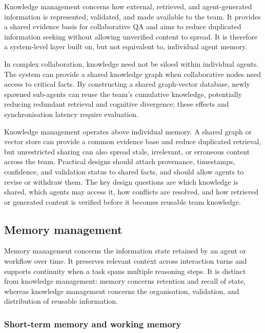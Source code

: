 \documentclass[a4paper,fleqn]{cas-dc}
\begin{document}
Knowledge management concerns how external, retrieved, and agent-generated
information is represented, validated, and made available to the team. It
provides a shared evidence basis for collaborative QA and aims to reduce
duplicated information seeking without allowing unverified content to spread.
It is therefore a system-level layer built on, but not equivalent to,
individual agent memory.

In complex collaboration, knowledge need not be siloed within individual
agents. The system can provide a shared knowledge graph when collaborative
nodes need access to critical facts. By constructing a shared graph-vector
database, newly spawned sub-agents can reuse the team's cumulative knowledge,
potentially reducing redundant retrieval and cognitive divergence; these
effects and synchronisation latency require evaluation.

Knowledge management operates above individual
memory. A shared graph or vector store can provide a common evidence base and
reduce duplicated retrieval, but unrestricted sharing can also spread stale,
irrelevant, or erroneous content across the team. Practical designs should
attach provenance, timestamps, confidence, and validation status to shared
facts, and should allow agents to revise or withdraw them. The key design
questions are which knowledge is shared, which agents may access it, how
conflicts are resolved, and how retrieved or generated content is verified
before it becomes reusable team knowledge.

\subsection{Memory management}
\label{sec:memory}

Memory management concerns the information state retained by an agent or
workflow over time. It preserves relevant context across interaction turns and
supports continuity when a task spans multiple reasoning steps. It is distinct
from knowledge management: memory concerns retention and recall of state,
whereas knowledge management concerns the organisation, validation, and
distribution of reusable information.

\subsubsection{Short-term memory and working memory}
\label{sec:short_mem}
\end{document}
